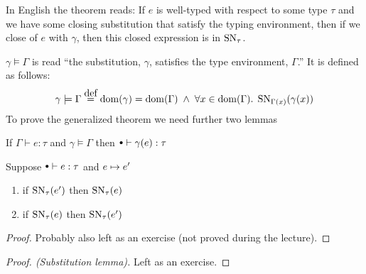 In English the theorem reads: If $e$ is well-typed with respect to some type $\tau$ and we have some closing substitution that satisfy the typing environment, then if we close of $e$ with $\gamma$, then this closed expression is in $\operatorname{SN}_\tau$.

$\gamma \models \Gamma$ is read ``the substitution, $\gamma$, satisfies the type environment, $\Gamma$.'' It is defined as follows:
\[
  \gamma \models \Gamma \eqdef \dom(\gamma) = \dom(\Gamma) \pand 
                 \forall x \in \dom(\Gamma). \; \SN{\Gamma(x)}{\gamma(x)}
\]
To prove the generalized theorem we need further two lemmas
\begin{substlem}
  If $\Gamma \vdash e : \tau$ and $\gamma \models \Gamma$ then $\mtenv \vdash \gamma (e) : \tau$
\end{substlem}
\begin{forback}
  Suppose $\mtenv \vdash e : \tau$ and $e \mapsto e'$
  \begin{enumerate}
  \item if $\operatorname{SN}_{\tau}(e')$ then $\operatorname{SN}_{\tau}(e)$
  \item if $\operatorname{SN}_{\tau}(e)$ then $\operatorname{SN}_{\tau}(e')$
  \end{enumerate}
\end{forback}
\begin{proof}
  Probably also left as an exercise (not proved during the lecture).
\end{proof}
\begin{proof}[Proof. (Substitution lemma)] 
  Left as an exercise.
\end{proof}
